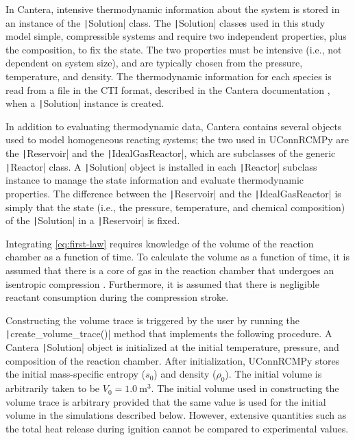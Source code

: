 \documentclass[12pt]{../ussci}
\begin{document}
In Cantera, intensive thermodynamic information about the system is
stored in an instance of the \texttt|Solution| class. The
\texttt|Solution| classes used in this study model simple, compressible
systems and require two independent properties, plus the composition, to
fix the state. The two properties must be intensive (i.e., not dependent
on system size), and are typically chosen from the pressure,
temperature, and density. The thermodynamic information for each species
is read from a file in the CTI format, described in the Cantera
documentation \autocite{cantera}, when a \texttt|Solution| instance is
created.

In addition to evaluating thermodynamic data, Cantera \autocite{cantera}
contains several objects used to model homogeneous reacting systems; the
two used in UConnRCMPy are the \texttt|Reservoir| and the
\texttt|IdealGasReactor|, which are subclasses of the generic
\texttt|Reactor| class. A \texttt|Solution| object is installed in each
\texttt|Reactor| subclass instance to manage the state information and
evaluate thermodynamic properties. The difference between the
\texttt|Reservoir| and the \texttt|IdealGasReactor| is simply that the
state (i.e., the pressure, temperature, and chemical composition) of the
\texttt|Solution| in a \texttt|Reservoir| is fixed.

Integrating \cref{eq:first-law} requires knowledge of the
volume of the reaction chamber as a function of time. To calculate the
volume as a function of time, it is assumed that there is a core of gas
in the reaction chamber that undergoes an isentropic compression
\autocite{Lee1998}. Furthermore, it is assumed that there is negligible
reactant consumption during the compression stroke.

Constructing the volume trace is triggered by the user by running the
\texttt|create_volume_trace()| method that implements the following
procedure. A Cantera \texttt|Solution| object is initialized at the
initial temperature, pressure, and composition of the reaction chamber.
After initialization, UConnRCMPy stores the initial mass-specific
entropy (\(s_0\)) and density (\(\rho_0\)). The initial volume is
arbitrarily taken to be \(V_0=\SI{1.0}{\m\cubed}\). The initial volume used
in constructing the volume trace is arbitrary provided that the same
value is used for the initial volume in the simulations described below.
However, extensive quantities such as the total heat release during
ignition cannot be compared to experimental values.
\end{document}
